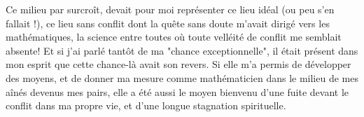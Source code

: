 Ce milieu par surcroît, devait pour moi représenter ce lieu idéal (ou peu s'en fallait !), ce lieu sans conflit dont la quête sans doute m'avait dirigé vers les mathématiques, la science entre toutes où toute velléité de conflit me semblait absente! Et si j'ai parlé tantôt de ma "chance exceptionnelle", il était présent dans mon esprit que cette chance-là avait son revers. Si elle m'a permis de développer des moyens, et de donner ma mesure comme mathématicien dans le milieu de mes aînés devenus mes pairs, elle a été aussi le moyen bienvenu d'une fuite devant le conflit dans ma propre vie, et d'une longue stagnation spirituelle.




